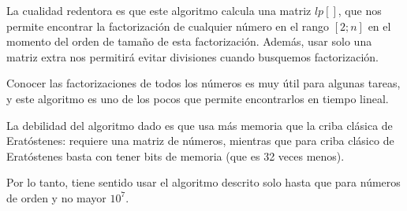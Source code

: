 La cualidad redentora es que este algoritmo calcula una matriz $lp[]$, que nos permite encontrar la factorización de cualquier número en el rango $[2;n]$ en el momento del orden de tamaño de esta factorización. Además, usar solo una matriz extra nos permitirá evitar divisiones cuando busquemos factorización.

Conocer las factorizaciones de todos los números es muy útil para algunas tareas, y este algoritmo es uno de los pocos que permite encontrarlos en tiempo lineal.

La debilidad del algoritmo dado es que usa más memoria que la criba clásica de Eratóstenes: requiere una matriz de números, mientras que para criba clásico de Eratóstenes basta con tener
bits de memoria (que es 32 veces menos).

Por lo tanto, tiene sentido usar el algoritmo descrito solo hasta que para números de orden
y no mayor $10^{7}$.
